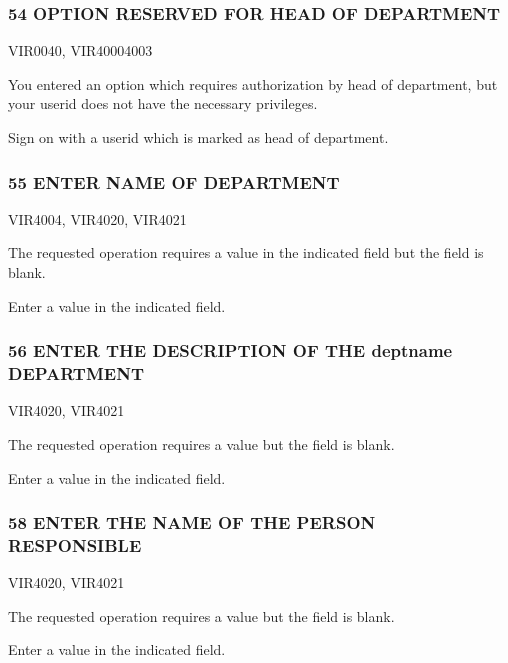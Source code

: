 \documentclass[letterpaper,10pt,english]{sphinxmanual}
\begin{document}
\subsubsection{54 OPTION RESERVED FOR HEAD OF DEPARTMENT}
\label{\detokenize{messages:option-reserved-for-head-of-department}}\begin{description}
\sphinxAtStartPar
VIR0040, VIR4000\sphinxhyphen{}4003

\sphinxAtStartPar
You entered an option which requires authorization by head of department, but your userid does not have the necessary privileges.

\sphinxAtStartPar
Sign on with a userid which is marked as head of department.

\end{description}


\subsubsection{55 ENTER NAME OF DEPARTMENT}
\label{\detokenize{messages:enter-name-of-department}}\begin{description}
\sphinxAtStartPar
VIR4004, VIR4020, VIR4021

\sphinxAtStartPar
The requested operation requires a value in the indicated field but the field is blank.

\sphinxAtStartPar
Enter a value in the indicated field.

\end{description}


\subsubsection{56 ENTER THE DESCRIPTION OF THE deptname DEPARTMENT}
\label{\detokenize{messages:enter-the-description-of-the-deptname-department}}\begin{description}
\sphinxAtStartPar
VIR4020, VIR4021

\sphinxAtStartPar
The requested operation requires a value but the field is blank.

\sphinxAtStartPar
Enter a value in the indicated field.

\end{description}


\subsubsection{58 ENTER THE NAME OF THE PERSON RESPONSIBLE}
\label{\detokenize{messages:enter-the-name-of-the-person-responsible}}\begin{description}
\sphinxAtStartPar
VIR4020, VIR4021

\sphinxAtStartPar
The requested operation requires a value but the field is blank.

\sphinxAtStartPar
Enter a value in the indicated field.

\end{description}
\end{document}

